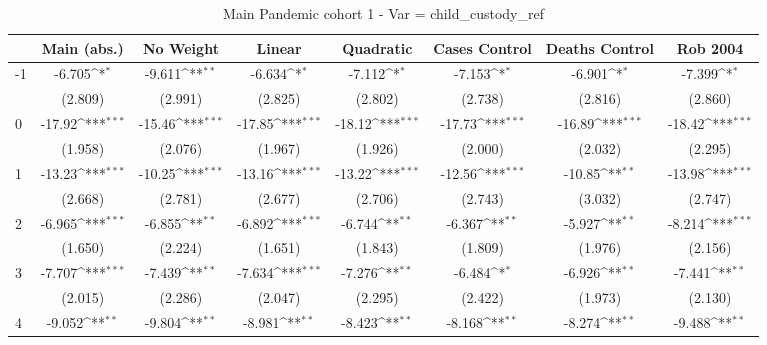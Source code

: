 \documentclass{article}
\begin{document}
{
\def\sym#1{\ifmmode^{#1}\else\(^{#1}\)\fi}
\begin{longtable}{l*{7}{c}}
\caption{Main Pandemic cohort 1 - Var = child\_custody\_ref}\\
\hline\hline\endfirsthead\hline\endhead\hline\endfoot\endlastfoot
                &\multicolumn{1}{c}{Main (abs.)}&\multicolumn{1}{c}{No Weight}&\multicolumn{1}{c}{Linear}&\multicolumn{1}{c}{Quadratic}&\multicolumn{1}{c}{Cases Control}&\multicolumn{1}{c}{Deaths Control}&\multicolumn{1}{c}{Rob 2004}\\
\hline
-1              &   -6.705\sym{*}  &   -9.611\sym{**} &   -6.634\sym{*}  &   -7.112\sym{*}  &   -7.153\sym{*}  &   -6.901\sym{*}  &   -7.399\sym{*}  \\
                &  (2.809)         &  (2.991)         &  (2.825)         &  (2.802)         &  (2.738)         &  (2.816)         &  (2.860)         \\
0               &   -17.92\sym{***}&   -15.46\sym{***}&   -17.85\sym{***}&   -18.12\sym{***}&   -17.73\sym{***}&   -16.89\sym{***}&   -18.42\sym{***}\\
                &  (1.958)         &  (2.076)         &  (1.967)         &  (1.926)         &  (2.000)         &  (2.032)         &  (2.295)         \\
1               &   -13.23\sym{***}&   -10.25\sym{***}&   -13.16\sym{***}&   -13.22\sym{***}&   -12.56\sym{***}&   -10.85\sym{**} &   -13.98\sym{***}\\
                &  (2.668)         &  (2.781)         &  (2.677)         &  (2.706)         &  (2.743)         &  (3.032)         &  (2.747)         \\
2               &   -6.965\sym{***}&   -6.855\sym{**} &   -6.892\sym{***}&   -6.744\sym{**} &   -6.367\sym{**} &   -5.927\sym{**} &   -8.214\sym{***}\\
                &  (1.650)         &  (2.224)         &  (1.651)         &  (1.843)         &  (1.809)         &  (1.976)         &  (2.156)         \\
3               &   -7.707\sym{***}&   -7.439\sym{**} &   -7.634\sym{***}&   -7.276\sym{**} &   -6.484\sym{*}  &   -6.926\sym{**} &   -7.441\sym{**} \\
                &  (2.015)         &  (2.286)         &  (2.047)         &  (2.295)         &  (2.422)         &  (1.973)         &  (2.130)         \\
4               &   -9.052\sym{**} &   -9.804\sym{**} &   -8.981\sym{**} &   -8.423\sym{**} &   -8.168\sym{**} &   -8.274\sym{**} &   -9.488\sym{**} \\

\end{longtable}}
\end{document}
